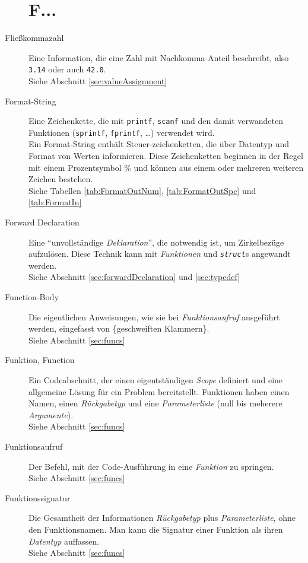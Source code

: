 \begin{appendices}
\begin{description}
\section*{F...}
\item[Fließkommazahl] Eine Information, die eine Zahl mit Nachkomma-Anteil beschreibt, also \eg
	\texttt{3.14} oder auch \texttt{42.0}.\\
	Siehe Abschnitt \ref{sec:valueAssignment}
\item[Format-String] Eine Zeichenkette, die mit \texttt{printf}, \texttt{scanf} und den damit
	verwandeten Funktionen (\texttt{sprintf}, \texttt{fprintf}, \ldots) verwendet wird.\\
	Ein Format-String enthält Steuer-zeichenketten, die über Datentyp und Format von Werten informieren. 
	Diese Zeichenketten beginnen in der Regel mit einem Prozentsymbol \% und können aus einem oder 
	mehreren weiteren Zeichen bestehen.\\
	Siehe Tabellen \ref{tab:FormatOutNum}, \ref{tab:FormatOutSpc} und \ref{tab:FormatIn}
\item[Forward Declaration] Eine \enquote{unvollständige \emph{Deklaration}}, die notwendig ist, um
	Zirkelbezüge aufzulösen. Diese Technik kann mit \emph{Funktionen} und \emph{\texttt{struct}}s
	angewandt werden.\\
	Siehe Abschnitt \ref{sec:forwardDeclaration} und \ref{sec:typedef}
\item[Function-Body] Die eigentlichen Anweisungen, wie sie bei \emph{Funktionsaufruf} ausgeführt werden,
	eingefasst von \{geschweiften Klammern\}.\\
	Siehe Abschnitt \ref{sec:funcs}
\item[Funktion, Function] Ein Codeabschnitt, der einen eigentständigen \emph{Scope} definiert und eine
	allgemeine Lösung für ein Problem bereitstellt. Funktionen haben einen Namen, einen
	\emph{Rückgabetyp} und eine \emph{Parameterliste} (\ie null bis meherere \emph{Argumente}).\\
	Siehe Abschnitt \ref{sec:funcs}
\item[Funktionsaufruf] Der Befehl, mit der Code-Ausführung in eine \emph{Funktion} zu springen.\\
	Siehe Abschnitt \ref{sec:funcs}
\item[Funktionssignatur] Die Gesamtheit der Informationen \emph{Rückgabetyp} plus \emph{Parameterliste},
	ohne den Funktionsnamen. Man kann die Signatur einer Funktion als ihren \emph{Datentyp} auffassen.\\
	Siehe Abschnitt \ref{sec:funcs}


\end{description}
\end{appendices}
